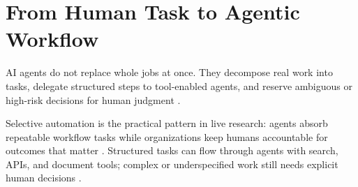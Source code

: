 
\section{From Human Task to Agentic Workflow}
\label{sec:agentic-workflow}

\begin{chapterintrobox}
AI agents do not replace whole jobs at once. They decompose real work into tasks, delegate
structured steps to tool-enabled agents, and reserve ambiguous or high-risk decisions for
human judgment \cite{mediumworkflowagents,arxiv2506workagents}.
\end{chapterintrobox}

Selective automation is the practical pattern in live research: agents absorb repeatable
workflow tasks while organizations keep humans accountable for outcomes that matter
\cite{recomaijobroles}. Structured tasks can flow through agents with search, APIs, and
document tools; complex or underspecified work still needs explicit human decisions
\cite{redditcomplextasks}.


